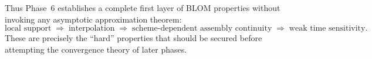 Thus Phase~6 establishes a complete first layer of BLOM properties without invoking any asymptotic approximation theorem:
\[
\boxed{
\text{local support}
\;\Longrightarrow\;
\text{interpolation}
\;\Longrightarrow\;
\text{scheme-dependent assembly continuity}
\;\Longrightarrow\;
\text{weak time sensitivity}.
}
\]
These are precisely the ``hard'' properties that should be secured before attempting the convergence theory of later phases.